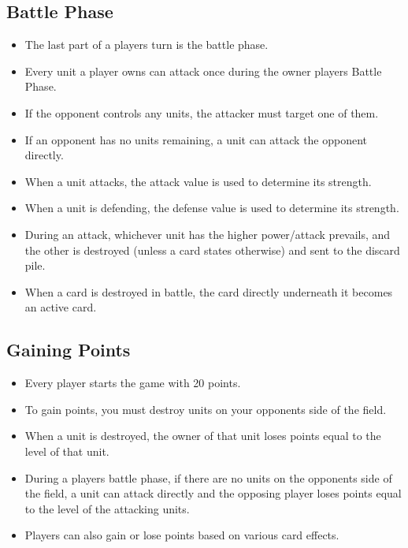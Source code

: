 \subsection{Battle Phase}
\begin{itemize}
    \item The last part of a players turn is the battle phase.
    \item Every unit a player owns can attack once during the owner players Battle Phase.
    \item If the opponent controls any units, the attacker must target one of them.
    \item If an opponent has no units remaining, a unit can attack the opponent directly.
    \item When a unit attacks, the attack value is used to determine its strength.
    \item When a unit is defending, the defense value is used to determine its strength.
    \item During an attack, whichever unit has the higher power/attack prevails, and the other is destroyed (unless a card states otherwise) and sent to the discard pile.
    \item When a card is destroyed in battle, the card directly underneath it becomes an active card.
\end{itemize}








\subsection{Gaining Points}
\begin{itemize}
    \item Every player starts the game with 20 points.
    \item To gain points, you must destroy units on your opponents side of the field.
    \item When a unit is destroyed, the owner of that unit loses points equal to the level of that unit.
    \item During a players battle phase, if there are no units on the opponents side of the field, a unit can attack directly and the opposing player loses points equal to the level of the attacking units.
    \item Players can also gain or lose points based on various card effects.
\end{itemize}








